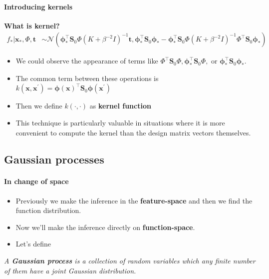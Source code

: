 \begin{frame}{\insertsubsection}
    \framesubtitle{Introducing kernels}

    \textcolor{UniGold}{\textbf{What is kernel?}}
    \begin{equation*}
        \begin{aligned} f_{*} | \mathbf{x}_{*}, \Phi, \mathbf{t} & \sim \mathcal{N}\left(\boldsymbol{\phi}_{*}^{\top} \mathbf{S}_0 \Phi\left(K+\beta^{-2} I\right)^{-1} \mathbf{t}, \boldsymbol{\phi}_{*}^{\top} \mathbf{S}_0 \boldsymbol{\phi}_{*}-\boldsymbol{\phi}_{*}^{\top} \mathbf{S}_0 \Phi\left(K+\beta^{-2} I\right)^{-1} \Phi^{\top} \mathbf{S}_0 \boldsymbol{\phi}_{*}\right)
        \end{aligned}
    \end{equation*}

    \begin{itemize}
        \item We could observe the appearance of terms like $\Phi^{\top} \mathbf{S}_0 \Phi, \boldsymbol{\phi}_{*}^{\top} \mathbf{S}_0 \Phi, \text { or } \boldsymbol{\phi}_{*}^{\top} \mathbf{S}_0 \boldsymbol{\phi}_{*}$.
        \item The common term between these operations is $k(\mathbf{x},\mathbf{x^{\prime}}) = \boldsymbol{\phi}(\mathbf{x})^{\top} \mathbf{S}_0 \boldsymbol{\phi}\left(\mathbf{x}^{\prime}\right)$
        \item Then we define $k(\cdot,\cdot)$ as \textcolor{UniOrange}{\textbf{kernel function}}
        \item This technique is particularly valuable in situations where it is more convenient to compute the kernel than the design matrix vectors themselves.
        
    \end{itemize}
    
\end{frame}

\subsection{Gaussian processes}
\begin{frame}{\insertsubsection}
    \framesubtitle{In change of space}

    \begin{itemize}
        \item Previously we make the inference in the \textcolor{UniOrange}{\textbf{feature-space}} and then we find the function distribution.
        \item Now we'll make the inference directly on \textcolor{UniOrange}{\textbf{function-space}}.
        \item Let's define
    \end{itemize}

    \begin{definition}
        \textit{
        A \textcolor{UniGold}{\textbf{Gaussian process}} is a collection of random variables which any finite number of them have a joint Gaussian distribution.}
    \end{definition}
\end{frame}

